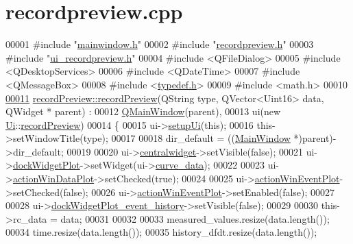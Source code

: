 \hypertarget{a00042_source}{\section{recordpreview.\+cpp}
\label{a00042_source}
}

\begin{DoxyCode}
00001 \textcolor{preprocessor}{#include "\hyperlink{a00039}{mainwindow.h}"}
00002 \textcolor{preprocessor}{#include "\hyperlink{a00043}{recordpreview.h}"}
00003 \textcolor{preprocessor}{#include "\hyperlink{a00053}{ui\_recordpreview.h}"}
00004 \textcolor{preprocessor}{#include <QFileDialog>}
00005 \textcolor{preprocessor}{#include <QDesktopServices>}
00006 \textcolor{preprocessor}{#include <QDateTime>}
00007 \textcolor{preprocessor}{#include <QMessageBox>}
00008 \textcolor{preprocessor}{#include <\hyperlink{a00001}{typedef.h}>}
00009 \textcolor{preprocessor}{#include <math.h>}
00010 
\hypertarget{a00042_source_l00011}{}\hyperlink{a00020_a03ad4ae83a5594f6dc337c7b71873edd}{00011} \hyperlink{a00020_a03ad4ae83a5594f6dc337c7b71873edd}{recordPreview::recordPreview}(QString type, QVector<Uint16> data, QWidget *
      parent) :
00012     \hyperlink{a00010}{QMainWindow}(parent),
00013     ui(new \hyperlink{a00055}{Ui}::\hyperlink{a00020}{recordPreview})
00014 \{
00015     ui->\hyperlink{a00028_afa41dc070a896a5eae476f3c0206825c}{setupUi}(\textcolor{keyword}{this});
00016     this->setWindowTitle(type);
00017 
00018     dir\_default = ((\hyperlink{a00006}{MainWindow} *)parent)->dir\_default;
00019 
00020     ui->\hyperlink{a00028_ac9ab4609922159e8e4cc45905f76928e}{centralwidget}->setVisible(\textcolor{keyword}{false});
00021     ui->\hyperlink{a00028_a07b76f17803ec09e0367b72938bbd097}{dockWidgetPlot}->setWidget(ui->\hyperlink{a00028_a247d94481323c0bc4f8b6458a8a535dd}{curve\_data});
00022 
00023     ui->\hyperlink{a00028_aa09067a9c96c9cd78f75261a9fcb89f0}{actionWinDataPlot}->setChecked(\textcolor{keyword}{true});
00024 
00025     ui->\hyperlink{a00028_ac72ec9c8679d46fd43a87f99ee6db893}{actionWinEventPlot}->setChecked(\textcolor{keyword}{false});
00026     ui->\hyperlink{a00028_ac72ec9c8679d46fd43a87f99ee6db893}{actionWinEventPlot}->setEnabled(\textcolor{keyword}{false});
00027 
00028     ui->\hyperlink{a00028_a2a8f7ee8d4458dd20481c8a1c29ce185}{dockWidgetPlot\_event\_history}->setVisible(\textcolor{keyword}{false});
00029 
00030     this->rc\_data = data;
00031 
00032 
00033     measured\_values.resize(data.length());
00034     time.resize(data.length());
00035     history\_dfdt.resize(data.length());

\end{DoxyCode}
